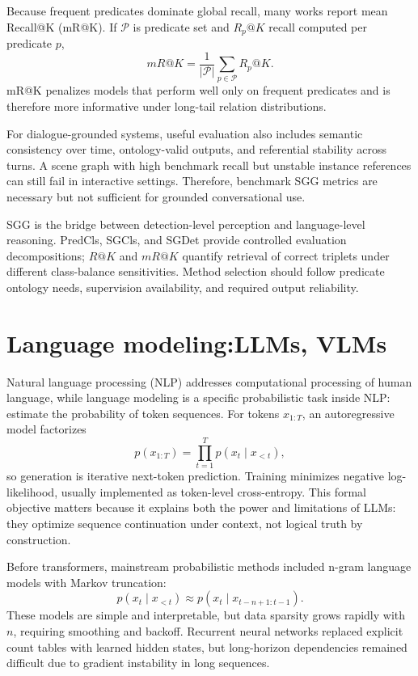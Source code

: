     Because frequent predicates dominate global recall, many works report mean Recall@K (mR@K). If \(\mathcal{P}\) is predicate set and \(R_p@K\) recall computed per predicate \(p\),
  \[
  mR@K = \frac{1}{|\mathcal{P}|}\sum_{p\in\mathcal{P}} R_p@K.
  \]
  mR@K penalizes models that perform well only on frequent predicates and is therefore more informative under long-tail relation distributions.

    For dialogue-grounded systems, useful evaluation also includes semantic consistency over time, ontology-valid outputs, and referential stability across turns. A scene graph with high benchmark recall
  but unstable instance references can still fail in interactive settings. Therefore, benchmark SGG metrics are necessary but not sufficient for grounded conversational use.

    SGG is the bridge between detection-level perception and language-level reasoning. PredCls, SGCls, and SGDet provide controlled evaluation decompositions; \(R@K\) and \(mR@K\) quantify retrieval of
  correct triplets under different class-balance sensitivities. Method selection should follow predicate ontology needs, supervision availability, and required output reliability.



  \section{Language modeling:\@ LLMs, VLMs}

  Natural language processing (NLP) addresses computational processing of human language, while language modeling is a specific probabilistic task inside NLP: estimate the probability of token sequences.
  For tokens \(x_{1:T}\), an autoregressive model factorizes
  \[
  p(x_{1:T})=\prod_{t=1}^{T}p(x_t\mid x_{<t}),
  \]
  so generation is iterative next-token prediction. Training minimizes negative log-likelihood, usually implemented as token-level cross-entropy. This formal objective matters because it explains both
  the power and limitations of LLMs: they optimize sequence continuation under context, not logical truth by construction.

  Before transformers, mainstream probabilistic methods included n-gram language models with Markov truncation:
  \[
  p(x_t\mid x_{<t})\approx p(x_t\mid x_{t-n+1:t-1}).
  \]
  These models are simple and interpretable, but data sparsity grows rapidly with \(n\), requiring smoothing and backoff. Recurrent neural networks replaced explicit count tables with learned hidden
  states, but long-horizon dependencies remained difficult due to gradient instability in long sequences.

